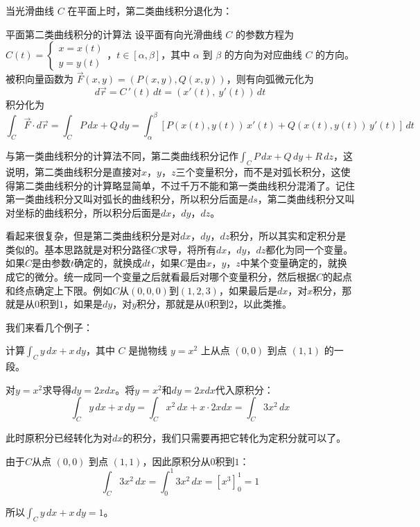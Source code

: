 当光滑曲线 \( C \) 在平面上时，第二类曲线积分退化为：

\begin{theorem}{平面第二类曲线积分的计算法}{}
设平面有向光滑曲线 \( C \) 的参数方程为  
\(
C(t) = \begin{cases}
x = x(t)\\
y = y(t)
\end{cases}\)，\(t \in [\alpha, \beta]\)，其中 \(\alpha\) 到 \(\beta\) 的方向为对应曲线 \( C \) 的方向。被积向量函数为 \(\vec{F}(x,y) = (P(x,y), Q(x,y))\)，则有向弧微元化为
\[
d\vec{r} = C\,'(t)\,dt = (x'(t),\ y'(t))\,dt
\]
积分化为
\[
\int_C \vec{F} \cdot d\vec{r} = \int_C P\,dx + Q\,dy = \int_{\alpha}^{\beta} [ P(x(t),y(t))\,x'(t) + Q(x(t),y(t))\,y'(t) ]\,dt
\]
\end{theorem}

与第一类曲线积分的计算法不同，第二类曲线积分记作\(\int_C P\,dx + Q\,dy + R\,dz\)，这说明，第二类曲线积分是直接对\(x\)，\(y\)，\(z\)三个变量积分，而不是对弧长积分，这使得第二类曲线积分的计算略显简单，不过千万不能和第一类曲线积分混淆了。记住第一类曲线积分又叫对弧长的曲线积分，所以积分后面是\(ds\)，第二类曲线积分又叫对坐标的曲线积分，所以积分后面是\(dx\)，\(dy\)，\(dz\)。

看起来很复杂，但是第二类曲线积分是对\(dx\)，\(dy\)，\(dz\)积分，所以其实和定积分是类似的。基本思路就是对积分路径$C$求导，将所有\(dx\)，\(dy\)，\(dz\)都化为同一个变量。如果$C$是由参数$t$确定的，就换成$dt$，如果$C$是由\(x\)，\(y\)，\(z\)中某个变量确定的，就换成它的微分。统一成同一个变量之后就看最后对哪个变量积分，然后根据$C$的起点和终点确定上下限。例如$C$从\((0,0,0)\)到\((1,2,3)\)，如果最后是\(dx\)，对\(x\)积分，那就是从\(0\)积到\(1\)，如果是\(dy\)，对\(y\)积分，那就是从\(0\)积到\(2\)，以此类推。

我们来看几个例子：

\begin{myexample}
    计算\(\int_C y\,dx + x\,dy\)，其中 $C$ 是抛物线 $y = x^2$ 上从点 $(0,0)$ 到点 $(1,1)$ 的一段。

    对$y = x^2$求导得\(dy=2xdx\)。将$y = x^2$和\(dy=2xdx\)代入原积分：
    \[
    \int_C y\,dx + x\,dy=\int_C x^2\,dx + x\cdot 2xdx=\int_C 3x^2 \,dx
    \]

    此时原积分已经转化为对\(dx\)的积分，我们只需要再把它转化为定积分就可以了。

    由于$C$从点 $(0,0)$ 到点 $(1,1)$，因此原积分从\(0\)积到\(1\)：
    \[
    \int_C 3x^2 \,dx=\int_0^1 3x^2\,dx = [x^3]_0^1 = 1
    \]

    所以\(\int_C y\,dx + x\,dy=1\)。
\end{myexample}


